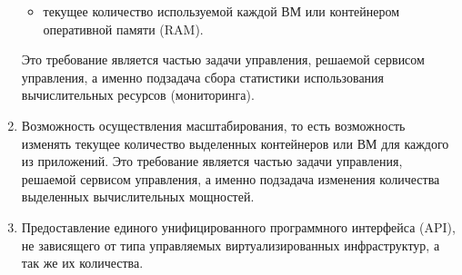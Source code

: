 \begin{enumerate}
\begin{itemize}
        \item текущее количество используемой каждой ВМ или контейнером оперативной памяти (RAM).
    \end{itemize}
    Это требование является частью задачи управления, решаемой сервисом управления, а именно подзадача сбора статистики использования вычислительных ресурсов (мониторинга).
    \item Возможность осуществления масштабирования, то есть возможность изменять текущее количество выделенных контейнеров или ВМ для каждого из приложений.
    Это требование является частью задачи управления, решаемой сервисом управления, а именно подзадача изменения количества выделенных вычислительных мощностей.
    \item Предоставление единого унифицированного программного интерфейса (API), не зависящего от типа управляемых виртуализированных инфраструктур, а так же их количества.
\end{enumerate}